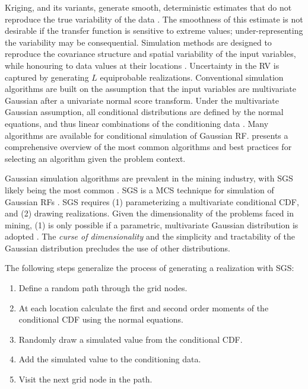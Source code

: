 Kriging, and its variants, generate smooth, deterministic estimates that do not reproduce the true variability of the data \citep{deutsch1992geostatistical}. The smoothness of this estimate is not desirable if the transfer function is sensitive to extreme values; under-representing the variability may be consequential. Simulation methods are designed to reproduce the covariance structure and spatial variability of the input variables, while honouring to data values at their locations \citep{goovaerts1997geostatistics}. Uncertainty in the \gls{RV} is captured by generating $L$ equiprobable realizations. Conventional simulation algorithms are built on the assumption that the input variables are multivariate Gaussian after a univariate normal score transform. Under the multivariate Gaussian assumption, all conditional distributions are defined by the normal equations, and thus linear combinations of the conditioning data \citep{chiles2012geostatistics}. Many algorithms are available for conditional simulation of Gaussian \gls{RF}. \cite{pinto2020independent} presents a comprehensive overview of the most common algorithms and best practices for selecting an algorithm given the problem context.

Gaussian simulation algorithms are prevalent in the mining industry, with \gls{SGS} likely being the most common \citep{rossi2013mineral}. \Gls{SGS} is a \gls{MCS} technique for simulation of Gaussian \glspl{RF} \citep{gomez-hernandez1993joint,isaaks1990application,goovaerts1997geostatistics,gomez-hernandez2021one}. \Gls{SGS} requires (1) parameterizing a multivariate conditional \gls{CDF}, and (2) drawing realizations. Given the dimensionality of the problems faced in mining, (1) is only possible if a parametric, multivariate Gaussian distribution is adopted \citep{leuangthong2008solved}. The \textit{curse of dimensionality} \citep{bellman1961adaptive} and the simplicity and tractability of the Gaussian distribution precludes the use of other distributions.

The following steps generalize the process of generating a realization with \gls{SGS}:
\begin{enumerate}[noitemsep]
    \item Define a random path through the grid nodes.
    \item At each location calculate the first and second order moments of the conditional \gls{CDF} using the normal equations.
    \item Randomly draw a simulated value from the conditional \gls{CDF}.
    \item Add the simulated value to the conditioning data.
    \item Visit the next grid node in the path.
\end{enumerate}

